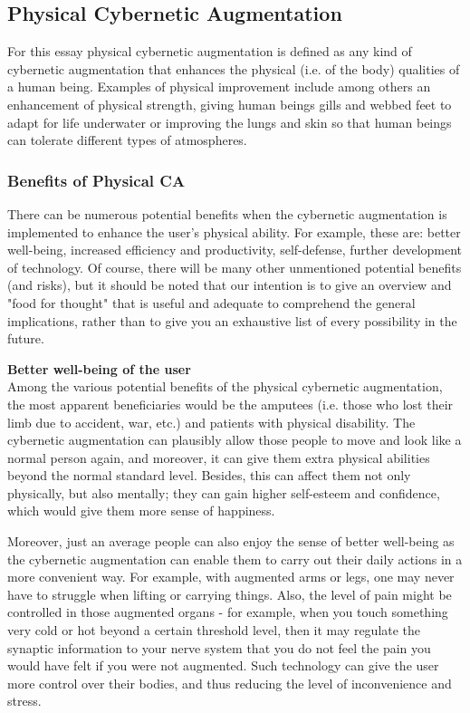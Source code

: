 \subsection{Physical Cybernetic Augmentation}

For this essay physical cybernetic augmentation is defined as any kind of cybernetic augmentation that enhances the physical (i.e. of the body) qualities of a human being. Examples of physical improvement include among others an enhancement of physical strength, giving human beings gills and webbed feet to adapt for life underwater or improving the lungs and skin so that human beings can tolerate different types of atmospheres.

\subsubsection{Benefits of Physical CA}

There can be numerous potential benefits when the cybernetic augmentation is implemented to enhance the user's physical ability. For example, these are: better well-being, increased efficiency and productivity, self-defense, further development of technology. Of course, there will be many other unmentioned potential benefits (and risks), but it should be noted that our intention is to give an overview and "food for thought" that is useful and adequate to comprehend the general implications, rather than to give you an exhaustive list of every possibility in the future. 


{\bf Better well-being of the user} \\
Among the various potential benefits of the physical cybernetic augmentation, the most apparent beneficiaries would be the amputees (i.e. those who lost their limb due to accident, war, etc.) and patients with physical disability. The cybernetic augmentation can plausibly allow those people to move and look like a normal person again, and moreover, it can give them extra physical abilities beyond the normal standard level. Besides, this can affect them not only physically, but also mentally; they can gain higher self-esteem and confidence, which would give them more sense of happiness. 

Moreover, just an average people can also enjoy the sense of better well-being as the cybernetic augmentation can enable them to carry out their daily actions in a more convenient way. For example, with augmented arms or legs, one may never have to struggle when lifting or carrying things. Also, the level of pain might be controlled in those augmented organs - for example, when you touch something very cold or hot beyond a certain threshold level, then it may regulate the synaptic information to your nerve system that you do not feel the pain you would have felt if you were not augmented. Such technology can give the user more control over their bodies, and thus reducing the level of inconvenience and stress.

